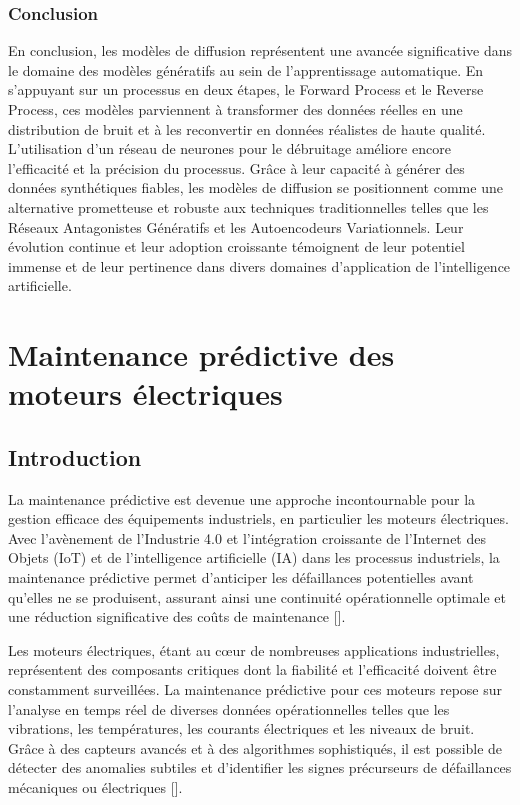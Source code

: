 \subsection{Conclusion}

En conclusion, les modèles de diffusion représentent une avancée significative
dans le domaine des modèles génératifs au sein de l'apprentissage automatique.
En s'appuyant sur un processus en deux étapes, le Forward Process et le Reverse
Process, ces modèles parviennent à transformer des données réelles en une
distribution de bruit et à les reconvertir en données réalistes de haute
qualité. L'utilisation d'un réseau de neurones pour le débruitage améliore
encore l'efficacité et la précision du processus. Grâce à leur capacité à
générer des données synthétiques fiables, les modèles de diffusion se
positionnent comme une alternative prometteuse et robuste aux techniques
traditionnelles telles que les Réseaux Antagonistes Génératifs et les
Autoencodeurs Variationnels. Leur évolution continue et leur adoption
croissante témoignent de leur potentiel immense et de leur pertinence dans
divers domaines d'application de l'intelligence artificielle.

\newpage


\chapter{Maintenance prédictive des moteurs électriques}
\section{Introduction}

La maintenance prédictive est devenue une approche incontournable pour la
gestion efficace des équipements industriels, en particulier les moteurs
électriques. Avec l'avènement de l'Industrie 4.0 et l'intégration croissante de
l'Internet des Objets (IoT) et de l'intelligence artificielle (IA) dans les
processus industriels, la maintenance prédictive permet d'anticiper les
défaillances potentielles avant qu'elles ne se produisent, assurant ainsi une
continuité opérationnelle optimale et une réduction significative des coûts de
maintenance [\cite{Mrozek2023}].

Les moteurs électriques, étant au cœur de nombreuses applications
industrielles, représentent des composants critiques dont la fiabilité et
l'efficacité doivent être constamment surveillées. La maintenance prédictive
pour ces moteurs repose sur l'analyse en temps réel de diverses données
opérationnelles telles que les vibrations, les températures, les courants
électriques et les niveaux de bruit. Grâce à des capteurs avancés et à des
algorithmes sophistiqués, il est possible de détecter des anomalies subtiles et
d'identifier les signes précurseurs de défaillances mécaniques ou électriques
[\cite{Bentivogli2023}].

